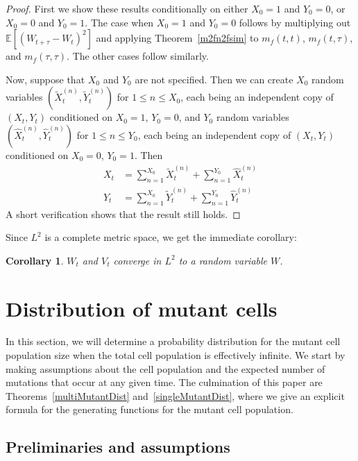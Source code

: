 \documentclass[12pt]{amsart}
\theoremstyle{plain}
\newtheorem{cor}[thm]{Corollary}
\theoremstyle{definition}
\theoremstyle{remark}
\theoremstyle{definition}
\begin{document}
\begin{proof}
First we show these results conditionally on either $X_0 = 1$ and $Y_0 = 0$, or $X_0 = 0$ and $Y_0 = 1$.  The case when $X_0 = 1$ and $Y_0 = 0$ follows by multiplying out $\mathbb{E}\left[\left(W_{t+\tau} - W_t \right)^2 \right] $ and applying Theorem~\ref{m2fn2fsim} to $m_f(t,t)$, $m_f(t,\tau)$, and $m_f(\tau,\tau)$.  The other cases follow similarly.

Now, suppose that $X_0$ and $Y_0$ are not specified.  Then we can create $X_0$ random variables $(\tilde X^{(n)}_t,\tilde Y^{(n)}_t)$ for $1 \le n \le X_0$, each being an independent copy of $(X_t,Y_t)$ conditioned on $X_0=1$, $Y_0 = 0$, and $Y_0$ random variables $(\hat X^{(n)}_t,\hat Y^{(n)}_t)$ for $1 \le n \le Y_0$, each being an independent copy of $(X_t,Y_t)$ conditioned on $X_0=0$, $Y_0 = 1$.  Then
\begin{equation}
\begin{aligned}
X_t &= \sum_{n=1}^{X_0} \tilde X^{(n)}_t + \sum_{n=1}^{Y_0} \hat X^{(n)}_t \\
Y_t &= \sum_{n=1}^{X_0} \tilde Y^{(n)}_t + \sum_{n=1}^{Y_0} \hat Y^{(n)}_t
\end{aligned}
\end{equation}
A short verification shows that the result still holds.
\end{proof}

Since $L^2$ is a complete metric space, we get the immediate corollary:

\begin{cor} \label{cor w v}
$W_t$ and $V_t$ converge in $L^2$ to a random variable $W$.
\end{cor}

\section{Distribution of mutant cells} \label{mutants}

In this section, we will determine a probability distribution for the mutant cell population size when the total cell population is effectively infinite. We start by making assumptions about the cell population and the expected number of mutations that occur at any given time. The culmination of this paper are Theorems~\ref{multiMutantDist} and~\ref{singleMutantDist}, where we give an explicit formula for the generating functions for the mutant cell population.

\subsection{Preliminaries and assumptions}
\end{document}
